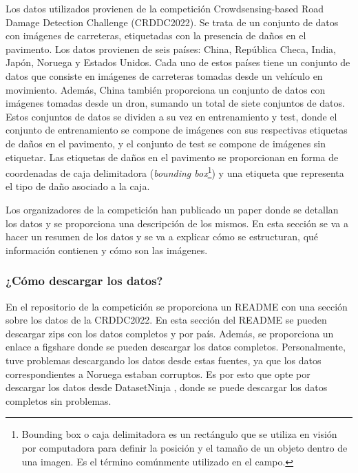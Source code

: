 Los datos utilizados provienen de la competición Crowdsensing-based Road Damage Detection Challenge (CRDDC2022)\cite{CRDDC2022_paper}. Se trata de un conjunto de datos con imágenes de carreteras, etiquetadas con la presencia de daños en el pavimento. Los datos provienen de seis países: China, República Checa, India, Japón, Noruega y Estados Unidos. Cada uno de estos países tiene un conjunto de datos que consiste en imágenes de carreteras tomadas desde un vehículo en movimiento. Además, China también proporciona un conjunto de datos con imágenes tomadas desde un dron, sumando un total de siete conjuntos de datos. Estos conjuntos de datos se dividen a su vez en entrenamiento y test, donde el conjunto de entrenamiento se compone de imágenes con sus respectivas etiquetas de daños en el pavimento, y el conjunto de test se compone de imágenes sin etiquetar. Las etiquetas de daños en el pavimento se proporcionan en forma de coordenadas de caja delimitadora (\textit{bounding box}\footnote{Bounding box o caja delimitadora es un rectángulo que se utiliza en visión por computadora para definir la posición y el tamaño de un objeto dentro de una imagen. Es el término comúnmente utilizado en el campo.}) y una etiqueta que representa el tipo de daño asociado a la caja. 

Los organizadores de la competición han publicado un paper \cite{RDD2022_data_paper} donde se detallan los datos y se proporciona una descripción de los mismos. En esta sección se va a hacer un resumen de los datos y se va a explicar cómo se estructuran, qué información contienen y cómo son las imágenes.


\subsubsection{¿Cómo descargar los datos?}
En el repositorio de la competición \cite{RoadDamageDetector_repo} se proporciona un README con una sección sobre los datos de la CRDDC2022. En esta sección del README se pueden descargar zips con los datos completos y por país. Además, se proporciona un enlace a figshare \cite{RDD2022_dataset} donde se pueden descargar los datos completos. Personalmente, tuve problemas descargando los datos desde estas fuentes, ya que los datos correspondientes a Noruega estaban corruptos. Es por esto que opte por descargar los datos desde DatasetNinja \cite{RDD2022_datasetNinja}, donde se puede descargar los datos completos sin problemas.


